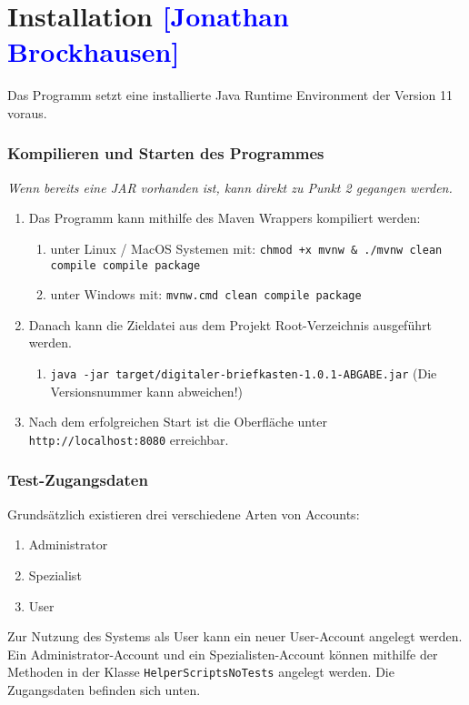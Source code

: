 

\section{Installation \textcolor{blue}{[Jonathan Brockhausen]}}
\label{instal}
Das Programm setzt eine installierte Java Runtime Environment der Version 11 voraus.
\subsubsection*{Kompilieren und Starten des Programmes}
\textit{Wenn bereits eine JAR vorhanden ist, kann direkt zu Punkt 2 gegangen werden.}
\begin{enumerate}
	\item{Das Programm kann mithilfe des Maven Wrappers kompiliert werden:}
	\begin{enumerate}
		\item{unter Linux / MacOS Systemen mit: \texttt{chmod +x mvnw \& ./mvnw clean compile compile package}}
		\item{unter Windows mit: \texttt{mvnw.cmd clean compile package}}
	\end{enumerate}
	\item{Danach kann die Zieldatei aus dem Projekt Root-Verzeichnis ausgeführt werden.}
	\begin{enumerate}
		\item{\texttt{java -jar target/digitaler-briefkasten-1.0.1-ABGABE.jar} (Die Versionsnummer kann abweichen!)}
	\end{enumerate}
	\item{Nach dem erfolgreichen Start ist die Oberfläche unter \texttt{http://localhost:8080} erreichbar.}
\end{enumerate}

\subsubsection*{Test-Zugangsdaten}
Grundsätzlich existieren drei verschiedene Arten von Accounts:
\begin{enumerate}
	\item{Administrator}
	\item{Spezialist}
	\item{User}
\end{enumerate}

Zur Nutzung des Systems als User kann ein neuer User-Account angelegt werden.\\
Ein Administrator-Account und ein Spezialisten-Account können mithilfe der Methoden in der Klasse \texttt{HelperScriptsNoTests} angelegt werden. Die Zugangsdaten befinden sich unten.\\

